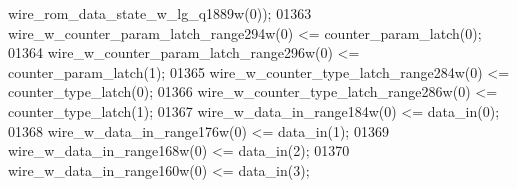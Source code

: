 \begin{DoxyCode}
{{      wire_rom_data_state_w_lg_q1889w}\textcolor{vhdlchar}{(}\textcolor{vhdllogic}{}\textcolor{vhdllogic}{0}\textcolor{vhdlchar}{)}\textcolor{vhdlchar}{)};
01363     \textcolor{vhdlchar}{wire_w_counter_param_latch_range294w}\textcolor{vhdlchar}{(}\textcolor{vhdllogic}{}\textcolor{vhdllogic}{0}\textcolor{vhdlchar}{)} \textcolor{vhdlchar}{<=} \textcolor{vhdlchar}{counter_param_latch}\textcolor{vhdlchar}{(}\textcolor{vhdllogic}{}\textcolor{vhdllogic}{0}\textcolor{vhdlchar}{)};
01364     \textcolor{vhdlchar}{wire_w_counter_param_latch_range296w}\textcolor{vhdlchar}{(}\textcolor{vhdllogic}{}\textcolor{vhdllogic}{0}\textcolor{vhdlchar}{)} \textcolor{vhdlchar}{<=} \textcolor{vhdlchar}{counter_param_latch}\textcolor{vhdlchar}{(}\textcolor{vhdllogic}{}\textcolor{vhdllogic}{1}\textcolor{vhdlchar}{)};
01365     \textcolor{vhdlchar}{wire_w_counter_type_latch_range284w}\textcolor{vhdlchar}{(}\textcolor{vhdllogic}{}\textcolor{vhdllogic}{0}\textcolor{vhdlchar}{)} \textcolor{vhdlchar}{<=} \textcolor{vhdlchar}{counter_type_latch}\textcolor{vhdlchar}{(}\textcolor{vhdllogic}{}\textcolor{vhdllogic}{0}\textcolor{vhdlchar}{)};
01366     \textcolor{vhdlchar}{wire_w_counter_type_latch_range286w}\textcolor{vhdlchar}{(}\textcolor{vhdllogic}{}\textcolor{vhdllogic}{0}\textcolor{vhdlchar}{)} \textcolor{vhdlchar}{<=} \textcolor{vhdlchar}{counter_type_latch}\textcolor{vhdlchar}{(}\textcolor{vhdllogic}{}\textcolor{vhdllogic}{1}\textcolor{vhdlchar}{)};
01367     \textcolor{vhdlchar}{wire_w_data_in_range184w}\textcolor{vhdlchar}{(}\textcolor{vhdllogic}{}\textcolor{vhdllogic}{0}\textcolor{vhdlchar}{)} \textcolor{vhdlchar}{<=} \textcolor{vhdlchar}{data_in}\textcolor{vhdlchar}{(}\textcolor{vhdllogic}{}\textcolor{vhdllogic}{0}\textcolor{vhdlchar}{)};
01368     \textcolor{vhdlchar}{wire_w_data_in_range176w}\textcolor{vhdlchar}{(}\textcolor{vhdllogic}{}\textcolor{vhdllogic}{0}\textcolor{vhdlchar}{)} \textcolor{vhdlchar}{<=} \textcolor{vhdlchar}{data_in}\textcolor{vhdlchar}{(}\textcolor{vhdllogic}{}\textcolor{vhdllogic}{1}\textcolor{vhdlchar}{)};
01369     \textcolor{vhdlchar}{wire_w_data_in_range168w}\textcolor{vhdlchar}{(}\textcolor{vhdllogic}{}\textcolor{vhdllogic}{0}\textcolor{vhdlchar}{)} \textcolor{vhdlchar}{<=} \textcolor{vhdlchar}{data_in}\textcolor{vhdlchar}{(}\textcolor{vhdllogic}{}\textcolor{vhdllogic}{2}\textcolor{vhdlchar}{)};
01370     \textcolor{vhdlchar}{wire_w_data_in_range160w}\textcolor{vhdlchar}{(}\textcolor{vhdllogic}{}\textcolor{vhdllogic}{0}\textcolor{vhdlchar}{)} \textcolor{vhdlchar}{<=} \textcolor{vhdlchar}{data_in}\textcolor{vhdlchar}{(}\textcolor{vhdllogic}{}\textcolor{vhdllogic}{3}\textcolor{vhdlchar}{)};
}
\end{DoxyCode}

